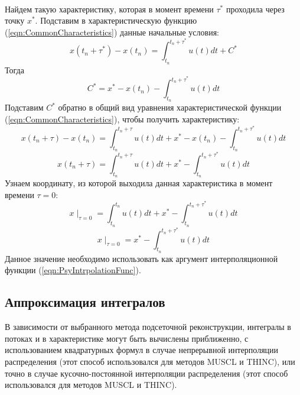 \documentclass[12pt,a4paper]{article}
\begin{document}
\\Найдем такую характеристику, которая в момент времени $\tau^*$ проходила через точку $x^*$. Подставим в характеристическую функцию (\ref{eqn:CommonCharacteristics}) данные начальные условия:
\[
x(t_n+\tau^*)-x(t_n)=\int_{t_n}^{t_n+\tau^*}u(t)dt + C^*
\]
Тогда
\[
C^* = x^*-x(t_n)-\int_{t_n}^{t_n+\tau^*}u(t)dt
\]
Подставим $C^*$ обратно в общий вид уравнения характеристической функции (\ref{eqn:CommonCharacteristics}), чтобы получить характеристику:
\[
x(t_n+\tau)-x(t_n)=\int_{t_n}^{t_n+\tau}u(t)dt + x^*-x(t_n)-\int_{t_n}^{t_n+\tau^*}u(t)dt
\]
\begin{equation}
\label{eqn:Characteristic}
x(t_n+\tau)=\int_{t_n}^{t_n+\tau}u(t)dt + x^*-\int_{t_n}^{t_n+\tau^*}u(t)dt
\end{equation}
Узнаем координату, из которой выходила данная характеристика в момент времени $\tau=0$:
\[
x\mid_{\tau=0}=\int_{t_n}^{t_n}u(t)dt + x^*-\int_{t_n}^{t_n+\tau^*}u(t)dt
\]
\begin{equation}
\label{eqn:CharacteristicFromZero}
x\mid_{\tau=0}=x^*-\int_{t_n}^{t_n+\tau^*}u(t)dt
\end{equation}
Данное значение необходимо использовать как аргумент интерполяционной функции (\ref{eqn:PsyIntrpolationFunc}).

\subsection{Аппроксимация интегралов}
В зависимости от выбранного метода подсеточной реконструкции, интегралы в потоках и в характеристике могут быть вычислены приближенно, с использованием квадратурных формул в случае непрерывной интерполяции распределения (этот способ использовался для методов MUSCL и THINC), или точно в случае кусочно-постоянной интерполяции распределения (этот способ использовался для методов MUSCL и THINC).
\end{document}
